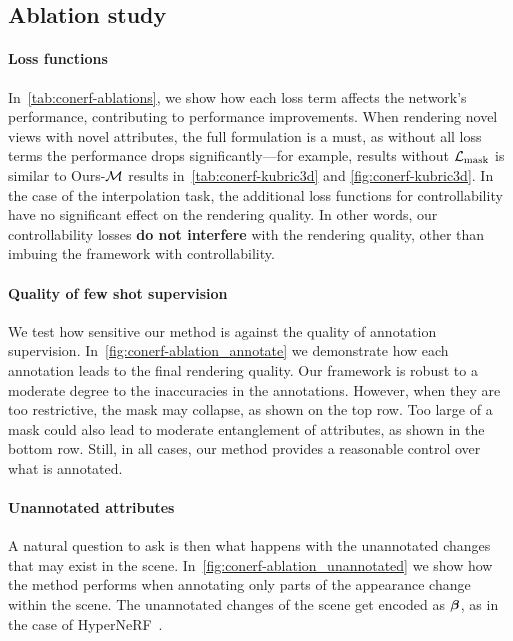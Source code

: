   \subsection{Ablation study}
    
    \paragraph{Loss functions}
      In~\cref{tab:conerf-ablations}, we show how each loss term affects the
      network's performance, contributing to performance improvements.
      When rendering novel views with novel attributes, the full formulation
      is a must, as without all loss terms the performance drops
      significantly---for example, results without $\mathcal{L}_\text{mask}$ is similar to
      Ours-$\mathcal{M}$ results in~\cref{tab:conerf-kubric3d} and
      \cref{fig:conerf-kubric3d}.
      In the case of the interpolation task, the additional loss functions for
      controllability have no significant effect on the rendering quality.
      In other words, our controllability losses \textbf{do not interfere}
      with the rendering quality, other than imbuing the framework with
      controllability.
      \vspace{-0.2em}

      
    \paragraph{Quality of few shot supervision}
      We test how sensitive our method is against the quality of annotation
      supervision.
      In~\cref{fig:conerf-ablation_annotate} we demonstrate how each
      annotation leads to the final rendering quality.
      Our framework is robust to a moderate degree to the inaccuracies in the
      annotations.
      However, when they are too restrictive, the mask may collapse, as shown
      on the top row.
      Too large of a mask could also lead to moderate entanglement of
      attributes, as shown in the bottom row.
      Still, in all cases, our method provides a reasonable control over what
      is annotated.

      
    \paragraph{Unannotated attributes}
      A natural question to ask is then what happens with the unannotated
      changes that may exist in the scene.
      In~\cref{fig:conerf-ablation_unannotated} we show how the method
      performs when annotating only parts of the appearance change within the
      scene.
      The unannotated changes of the scene get encoded as ${\boldsymbol{\beta}}$, as in the
      case of HyperNeRF~\cite{park2021hypernerf}.
